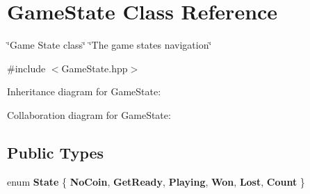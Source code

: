 \hypertarget{classGameState}{}\section{Game\+State Class Reference}
\label{classGameState}


\char`\"{}\+Game State class\char`\"{}  \char`\"{}\+The game states navigation\char`\"{}  




{\ttfamily \#include $<$Game\+State.\+hpp$>$}



Inheritance diagram for Game\+State\+:


Collaboration diagram for Game\+State\+:
\subsection*{Public Types}
\begin{DoxyCompactItemize}
\item 
\mbox{\label{classGameState_a81618e0403319d48e9f25347111f8157}} 
enum {\bfseries State} \{ \newline
{\bfseries No\+Coin}, 
{\bfseries Get\+Ready}, 
{\bfseries Playing}, 
{\bfseries Won}, 
\newline
{\bfseries Lost}, 
{\bfseries Count}
 \}
\end{DoxyCompactItemize}
